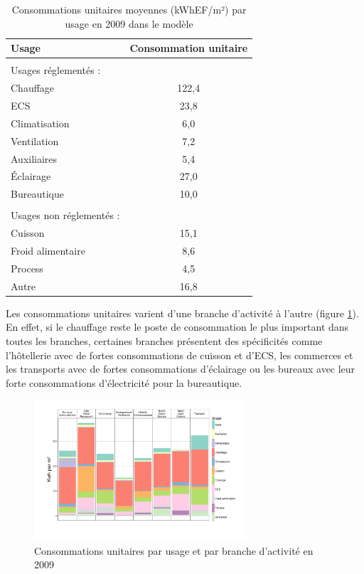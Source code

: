 \documentclass[10.5pt,a4paper]{article}
\begin{document}
{\begin{table}[h!]
\caption{Consommations unitaires moyennes (kWhEF/m²) par usage en 2009 dans le modèle }
\label{ConsoU_usage}
\begin{center}
\begin{tabular}{l|c}
\textbf{Usage}	& \textbf{Consommation unitaire}	
\\	\hline	\\	
Usages réglementés : &  
\\	 \hline	
Chauffage         &    122,4 \\
ECS                &    23,8 \\
Climatisation     &      6,0 \\
Ventilation      &       7,2 \\
Auxiliaires     &        5,4 \\
Éclairage          &    27,0 \\
Bureautique      &      10,0 \\
\hline	\\	
Usages non réglementés : & 
\\	\hline	
Cuisson            &    15,1 \\
Froid alimentaire  &     8,6 \\
Process            &     4,5 \\
Autre           &       16,8 \\
\hline	
\end{tabular}
\end{center}
\end{table}

Les consommations unitaires varient d'une branche d'activité à l'autre (figure \ref{Conso_u_Branche}). En effet, si le chauffage reste le poste de consommation le plus important dans toutes les branches, certaines branches présentent des spécificités comme l'hôtellerie avec de fortes consommations de cuisson et d'ECS, les commerces et les transports avec de fortes consommations d'éclairage ou les bureaux avec leur forte consommations d'électricité pour la bureautique.

\begin{figure}[ht]
\centering
\caption{Consommations unitaires par usage et par branche d'activité en 2009}\label{Conso_u_Branche}
\includegraphics[width = 0.7\textwidth]{Conso_u_Branche} 
\end{figure}

}
\end{document}
